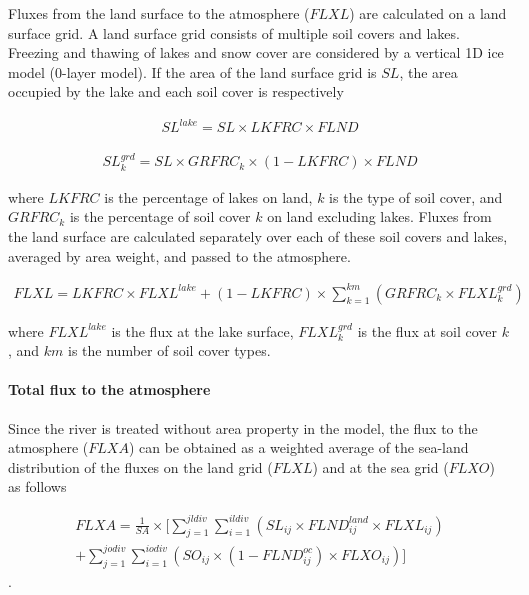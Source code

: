 Fluxes from the land surface to the atmosphere (\(FLXL\)) are calculated
on a land surface grid. A land surface grid consists of multiple soil
covers and lakes. Freezing and thawing of lakes and snow cover are
considered by a vertical 1D ice model (0-layer model). If the area of
the land surface grid is \(SL\), the area occupied by the lake and each
soil cover is respectively

\begin{eqnarray} SL^{lake}=SL  \times  LKFRC \times FLND \end{eqnarray}

\begin{eqnarray} SL^{grd}_k = SL \times GRFRC_k \times (1-LKFRC) \times FLND \end{eqnarray}

where \(LKFRC\) is the percentage of lakes on land, \(k\) is the type of
soil cover, and \(GRFRC_k\) is the percentage of soil cover \(k\) on
land excluding lakes. Fluxes from the land surface are calculated
separately over each of these soil covers and lakes, averaged by area
weight, and passed to the atmosphere.

\begin{eqnarray} FLXL = LKFRC \times FLXL^{lake} + (1-LKFRC) \times \sum_{k=1}^{km} (GRFRC_k \times FLXL_k^{grd}) \end{eqnarray}

where \(FLXL^{lake}\) is the flux at the lake surface,
\(FLXL_{k}^{grd}\) is the flux at soil cover \(k\), and \(km\) is the
number of soil cover types.

\hypertarget{total-flux-to-the-atmosphere}{%
\paragraph{Total flux to the
atmosphere}\label{total-flux-to-the-atmosphere}}

Since the river is treated without area property in the model, the flux
to the atmosphere (\(FLXA\)) can be obtained as a weighted average of
the sea-land distribution of the fluxes on the land grid (\(FLXL\)) and
at the sea grid (\(FLXO\)) as follows

\begin{eqnarray} FLXA = \frac{1}{SA} \times [ \sum _ {j=1}^{jldiv} \sum_{i=1}^{ildiv}(SL _ {ij} \times FLND^{land} _ {ij} \times FLXL_{ij}) \\ + \sum _ {j=1}^{jodiv}\sum _ {i=1}^{iodiv }(SO _ {ij} \times (1-FLND^{oc} _ {ij}) \times FLXO _ {ij})] \end{eqnarray}.

